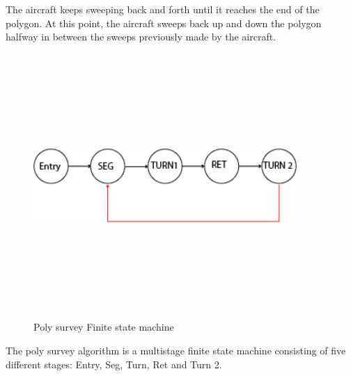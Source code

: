 The aircraft keeps sweeping back and forth until it reaches the end of the polygon. At this point, the aircraft sweeps back up and down the polygon halfway in between the sweeps previously made by the aircraft. 
\begin{figure}[H]
\centering
\includegraphics[width=10cm,height=10cm,keepaspectratio]{imagenes/FSM.png}
\caption{Poly survey Finite state machine }
\label{fig:FSM}
\end{figure}

The poly survey algorithm is a multistage finite state machine consisting of five different stages: Entry, Seg, Turn, Ret and Turn 2.
